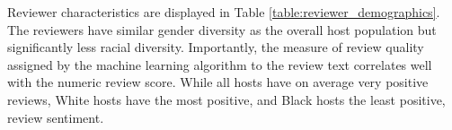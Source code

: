 Reviewer characteristics are displayed in Table \ref{table:reviewer_demographics}. The reviewers have similar gender diversity as the overall host population but significantly less racial diversity. Importantly, the measure of review quality assigned by the machine learning algorithm to the review text correlates well with the numeric review score. While all hosts have on average very positive reviews, White hosts have the most positive, and Black hosts the least positive, review sentiment. 










